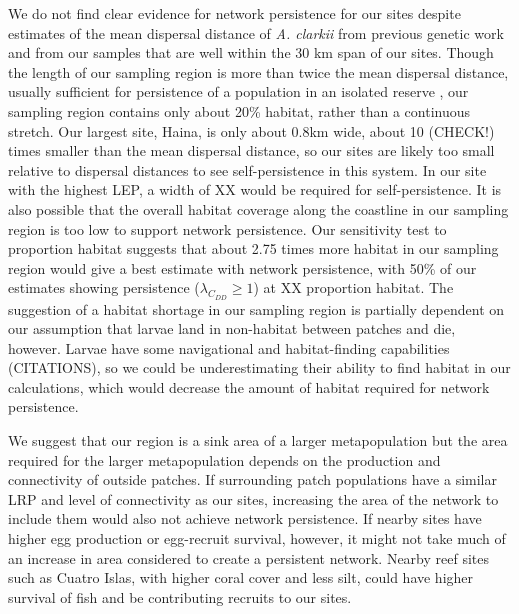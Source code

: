 \documentclass[12pt, oneside]{article}   	%
\begin{document}
We do not find clear evidence for network persistence for our sites despite estimates of the mean dispersal distance of \textit{A. clarkii} from previous genetic work \citep[11 km,][]{pinsky2010using} and from our samples \citep{catalanoInPrepconnectivity} that are well within the 30 km span of our sites. Though the length of our sampling region is more than twice the mean dispersal distance, usually sufficient for persistence of a population in an isolated reserve \citep[e.g.][]{lockwood2002effects}, our sampling region contains only about 20\% habitat, rather than a continuous stretch. Our largest site, Haina, is only about 0.8km wide, about 10 (CHECK!) times smaller than the mean dispersal distance, so our sites are likely too small relative to dispersal distances to see self-persistence in this system. In our site with the highest LEP, a width of XX would be required for self-persistence. It is also possible that the overall habitat coverage along the coastline in our sampling region is too low to support network persistence. Our sensitivity test to proportion habitat suggests that about 2.75 times more habitat in our sampling region would give a best estimate with network persistence, with 50\% of our estimates showing persistence ($\lambda_{C_{DD}} \geq 1$) at XX proportion habitat. The suggestion of a habitat shortage in our sampling region is partially dependent on our assumption that larvae land in non-habitat between patches and die, however. Larvae have some navigational and habitat-finding capabilities (CITATIONS), so we could be underestimating their ability to find habitat in our calculations, which would decrease the amount of habitat required for network persistence.

We suggest that our region is a sink area of a larger metapopulation but the area required for the larger metapopulation depends on the production and connectivity of outside patches. If surrounding patch populations have a similar LRP and level of connectivity as our sites, increasing the area of the network to include them would also not achieve network persistence. If nearby sites have higher egg production or egg-recruit survival, however, it might not take much of an increase in area considered to create a persistent network. Nearby reef sites such as Cuatro Islas, with higher coral cover and less silt, could have higher survival of fish and be contributing recruits to our sites. %
\end{document}
